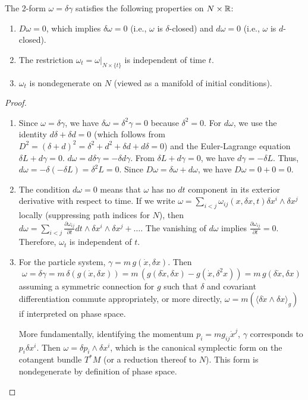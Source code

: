 \begin{lemma}
\label{lemma:properties_omega}
The 2-form $\omega = \delta\gamma$ satisfies the following properties on $N \times \mathbb{R}$:
\begin{enumerate}
    \item $D\omega = 0$, which implies $\delta\omega = 0$ (i.e., $\omega$ is $\delta$-closed) and $d\omega = 0$ (i.e., $\omega$ is $d$-closed).
    \item The restriction $\omega_t = \omega|_{N \times \{t\}}$ is independent of time $t$.
    \item $\omega_t$ is nondegenerate on $N$ (viewed as a manifold of initial conditions).
\end{enumerate}
\end{lemma}
\begin{proof}
    \,
\begin{enumerate}
    \item Since $\omega = \delta\gamma$, we have $\delta\omega = \delta^2\gamma = 0$ because $\delta^2=0$.
    For $d\omega$, we use the identity $d\delta + \delta d = 0$ (which follows from $D^2 = (\delta+d)^2 = \delta^2+d^2+\delta d+d\delta = 0$) and the Euler-Lagrange equation $\delta L + d\gamma = 0$.
    $d\omega = d\delta\gamma = -\delta d\gamma$. From $\delta L + d\gamma = 0$, we have $d\gamma = -\delta L$.
    Thus, $d\omega = -\delta(-\delta L) = \delta^2 L = 0$.
    Since $D\omega = \delta\omega + d\omega$, we have $D\omega = 0+0=0$.

    \item The condition $d\omega = 0$ means that $\omega$ has no $dt$ component in its exterior derivative with respect to time. If we write $\omega = \sum_{i<j} \omega_{ij}(x,\delta x, t) \delta x^i \wedge \delta x^j$ locally (suppressing path indices for $N$), then $d\omega = \sum_{i<j} \frac{\partial \omega_{ij}}{\partial t} dt \wedge \delta x^i \wedge \delta x^j + \dots$. The vanishing of $d\omega$ implies $\frac{\partial \omega_{ij}}{\partial t} = 0$. Therefore, $\omega_t$ is independent of $t$.

    \item For the particle system, $\gamma = m \, g(\dot{x}, \delta x)$. Then
    \begin{equation}
        \omega = \delta \gamma = m \, \delta (g(\dot{x}, \delta x)) = m \, (g(\delta \dot{x}, \delta x) - g(\dot{x}, \delta^2 x)) = m \, g(\delta \dot{x}, \delta x)
    \end{equation}
    assuming a symmetric connection for $g$ such that $\delta$ and covariant differentiation commute appropriately, or more directly, $\omega = m ( \langle \delta\dot{x} \wedge \delta x \rangle_g )$ if interpreted on phase space. 
    
    More fundamentally, identifying the momentum $p_i = m g_{ij}\dot{x}^j$, $\gamma$ corresponds to $p_i \delta x^i$. Then $\omega = \delta p_i \wedge \delta x^i$, which is the canonical symplectic form on the cotangent bundle $T^*M$ (or a reduction thereof to $N$). This form is nondegenerate by definition of phase space.
\end{enumerate}
\end{proof}

